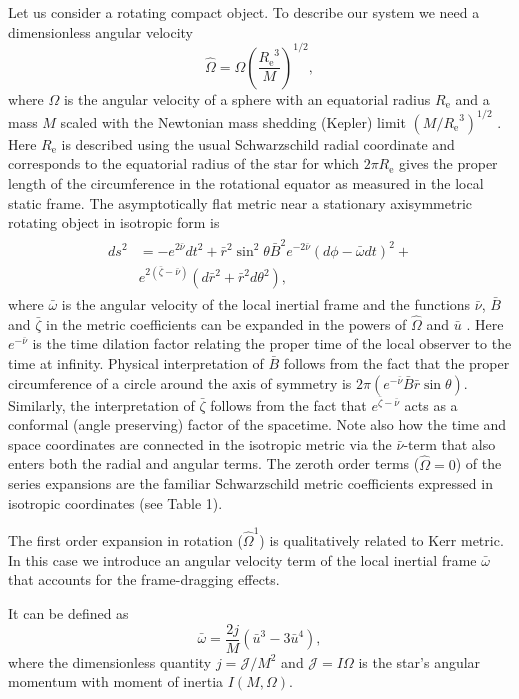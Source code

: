 \documentclass{aa}
\newcommand{\be}{\begin{equation}}
\newcommand{\ee}{\end{equation}}
\newcommand{\refe}[1]{#1}
\newcommand{\refedel}[1]{}
\newcommand{\Req}{\ensuremath{R_{\mathrm{e}}}}
\newcommand{\sch}{Schwarzschild }
\newcommand{\rb}{\ensuremath{\bar{r}}}
\newcommand{\ub}{\ensuremath{\bar{u}}}
\newcommand{\wb}{\ensuremath{\bar{\omega}}}
\newcommand{\Ob}{\ensuremath{\hat{\Omega}}}
\newcommand{\nub}{\ensuremath{\bar{\nu}}}
\newcommand{\zetab}{\ensuremath{\bar{\zeta}}}
\newcommand{\Bb}{\ensuremath{\bar{B}}}
\begin{document}
Let us consider a rotating compact object.
\refedel{In addition to the dimensionless compactness \refe{parameter} $u(r)$ (or $\ub(\rb)$),} To describe our system we need a dimensionless angular velocity
\be
\Ob = \Omega \left( \frac{\Req^3}{M} \right)^{1/2},
\ee
where $\Omega$ is the angular velocity of a sphere with an equatorial radius $\Req$ and a mass $M$ scaled with the Newtonian mass shedding (Kepler) limit $(M/\Req^3)^{1/2}$ \citep[see][p.29]{rcs}.  
Here $\Req$ is described using the usual \sch radial coordinate and corresponds to the equatorial radius of the star for which $2\pi\Req$ gives the proper length of the circumference \refe{in the rotational equator as measured in the local static frame.}
The asymptotically flat metric near a stationary axisymmetric rotating object in isotropic form is \citep{BW71} 
\begin{align}\begin{split} \label{eq:BWmetric}
ds^2 & = -e^{2\nub} dt^2 +
     \rb^2 \sin^2\theta \Bb^2 e^{-2\nub}(d\phi - \wb dt)^2 + \\
     & e^{2(\zetab-\nub)}(d\rb^2 + \rb^2d\theta^2),
\end{split}\end{align}
where $\wb$ is the angular velocity of the local inertial frame and the functions $\nub$, $\Bb$ and $\zetab$ in the metric coefficients can be expanded in the powers of $\Ob$ and $\ub$ \citep{BI76}.
Here $e^{-\nub}$ is the time dilation factor relating the proper time of the local observer to the time at infinity.
Physical interpretation of $\Bb$ follows from the fact that the proper circumference of a circle around the axis of symmetry is $2\pi(e^{-\nub} \Bb \rb \sin\theta)$.
Similarly, the interpretation of $\zetab$ follows from the fact that $e^{\zetab - \nub}$ acts as a conformal (angle preserving) factor of the spacetime. %
Note also how the time and space coordinates are connected in the isotropic metric via the $\nub$-term that also enters both the radial and angular terms.
The zeroth order terms ($\Ob = 0$) of the series expansions are the familiar \sch metric coefficients \refe{expressed in isotropic coordinates} (see Table 1).

The first order expansion in rotation ($\Ob^1$) is \refedel{formally}\refe{qualitatively} related to Kerr metric.
In this case we introduce an angular velocity term of the local inertial frame $\wb$ that accounts for the frame-dragging effects. 
\refedel{Up to \refe{second} order,} 
\refe{It} can be defined as
\be\label{eq:wbar}
\wb = \frac{2 j}{M} (\ub^3 - 3\ub^4),
\ee
where the dimensionless quantity $j=\mathcal{J}/M^2$ and $\mathcal{J} = I \Omega$ is the star's angular momentum with moment of inertia $I(M,\Omega)$.
\end{document}
